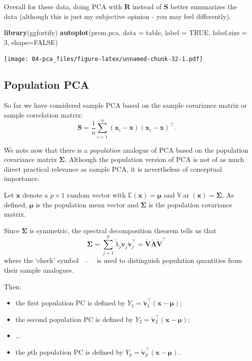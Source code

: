 \documentclass[]{book}
\newenvironment{Shaded}{\begin{snugshade}}{\end{snugshade}}
\newcommand{\DataTypeTok}[1]{\textcolor[rgb]{0.13,0.29,0.53}{#1}}
\newcommand{\DecValTok}[1]{\textcolor[rgb]{0.00,0.00,0.81}{#1}}
\newcommand{\KeywordTok}[1]{\textcolor[rgb]{0.13,0.29,0.53}{\textbf{#1}}}
\newcommand{\NormalTok}[1]{#1}
\newcommand{\OtherTok}[1]{\textcolor[rgb]{0.56,0.35,0.01}{#1}}
\providecommand{\tightlist}{%
  \setlength{\itemsep}{0pt}\setlength{\parskip}{0pt}}
\theoremstyle{definition}
\theoremstyle{definition}
\theoremstyle{definition}
\theoremstyle{remark}
\begin{document}
Overall for these data, doing PCA with \(\mathbf R\) instead of \(\mathbf S\) better summarizes the data (although this is just my subjective opinion - you may feel differently).

\begin{Shaded}
\begin{Highlighting}[]
\KeywordTok{library}\NormalTok{(ggfortify)}
\KeywordTok{autoplot}\NormalTok{(prem.pca, }\DataTypeTok{data =}\NormalTok{ table,  }\DataTypeTok{label =} \OtherTok{TRUE}\NormalTok{,  }\DataTypeTok{label.size =} \DecValTok{3}\NormalTok{, }\DataTypeTok{shape=}\OtherTok{FALSE}\NormalTok{)}
\end{Highlighting}
\end{Shaded}

\texttt{[image: 04-pca\_files/figure-latex/unnamed-chunk-32-1.pdf]}

\hypertarget{population-pca}{%
\subsection{Population PCA}\label{population-pca}}

So far we have considered sample PCA based on the sample covariance matrix or sample correlation matrix:
\[
\mathbf S=\frac{1}{n}\sum_{i=1}^n (\mathbf x_i-\bar{\mathbf x})(\mathbf x_i-\bar{\mathbf x})^\top.
\]

We note now that there is a \emph{population} analogue of PCA based on the population
covariance matrix \(\boldsymbol{\Sigma}\). Although the population version of PCA is not of as much direct practical
relevance as sample PCA, it is nevertheless of conceptual importance.

Let \(\mathbf x\) denote a \(p \times 1\) random vector with \({\mathbb{E}}(\mathbf x)={\pmb \mu}\) and \({\mathbb{V}\operatorname{ar}}(\mathbf x)={\pmb \Sigma}\). As defined,
\(\pmb \mu\) is the population mean vector and \(\pmb \Sigma\) is the population covariance matrix.

Since \(\pmb \Sigma\) is symmetric, the spectral decomposition theorem tells us that
\[
{\pmb \Sigma}=\sum_{j=1}^p \check{\lambda}_j \check{\mathbf v}_j \check{\mathbf v}_j^\top=\check{\mathbf V} \check{\boldsymbol \Lambda}\check{\mathbf V}^\top
\]
where the `check' symbol \(\quad \check{} \quad\) is used to distinguish population quantities from their sample analogues.

Then:

\begin{itemize}
\tightlist
\item
  the first population PC is defined by \(Y_1=\check{\mathbf v}_1^\top (\mathbf x-{\pmb \mu})\);
\item
  the second population PC is defined by \(Y_2=\check{\mathbf v}_2^\top (\mathbf x-{\pmb \mu})\);
\item
  \(\ldots\)
\item
  the \(p\)th population PC is defined by \(Y_p=\check{\mathbf v}_p^\top (\mathbf x-{\pmb \mu})\).
\end{itemize}
\end{document}
